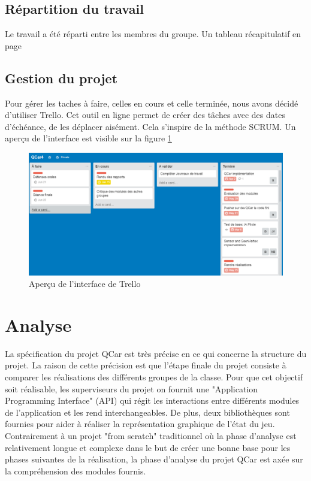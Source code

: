 \documentclass[a4paper, 12pt]{article}
\begin{document}
\subsection{Répartition du travail}
Le travail a été réparti entre les membres du groupe. Un tableau récapitulatif en page \pageref{tabletaches}
\subsection{Gestion du projet}
Pour gérer les taches à faire, celles en cours et celle terminée, nous avons décidé d'utiliser Trello. Cet outil en ligne permet de créer des tâches avec des dates d'échéance, de les déplacer aisément. Cela s'inspire de la méthode SCRUM. Un aperçu de l'interface est visible sur la figure \ref{fig:trello}
\begin{figure}[H]
\centering
\includegraphics[width=1\linewidth]{includes/images/trello}
\caption{Aperçu de l'interface de Trello}
\label{fig:trello}
\end{figure}
\section{Analyse}
La spécification du projet QCar est très précise en ce qui concerne la structure du projet. La raison de cette précision est que l'étape finale du projet consiste à comparer les réalisations des différents groupes de la classe. Pour que cet objectif soit réalisable, les superviseurs du projet on fournit une "Application Programming Interface" (API) qui régit les interactions entre différents modules de l'application et les rend interchangeables. De plus, deux bibliothèques sont fournies pour aider à réaliser la représentation graphique de l'état du jeu. Contrairement à un projet "from scratch" traditionnel où la phase d'analyse est relativement longue et complexe dans le but de créer une bonne base pour les phases suivantes de la réalisation, la phase d'analyse du projet QCar est axée sur la compréhension des modules fournis. 
\end{document}

